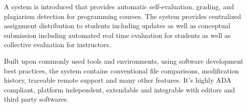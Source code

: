 \dissabstract

A system is introduced that provides automatic self-evaluation, grading, and plagiarism detection for programming courses. The system provides centralized assignment distribution to students including updates as well as conceptual submission including automated real time evaluation for students as well as collective evaluation for instructors.

Built upon commonly used tools and environments, using software development best practices, the system contains conventional file comparisons, modification history, traceable remote support and many other features. It’s highly ADA compliant, platform independent, extendable and integrable with editors and third party softwares.
